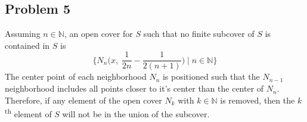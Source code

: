 \documentclass{article}
\begin{document}
\subsection*{Problem 5}
Assuming \(n\in\mathbb{N}\), an open cover for \(S\) such that no finite subcover of \(S\) is contained in \(S\) is
\begin{equation*}
	\bigg\{N_n\bigg(x,\;\frac{1}{2n}-\frac{1}{2(n+1)}\bigg)\;\bigg|\;n\in\mathbb{N}\bigg\}
\end{equation*}
The center point of each neighborhood \(N_n\) is positioned such that the \(N_{n-1}\) neighborhood includes all points closer to it's center than the center of \(N_n\). Therefore, if any element of the open cover \(N_k\) with \(k\in\mathbb{N}\) is removed, then the \(k\)\textsuperscript{th} element of \(S\) will not be in the union of the subcover.
\end{document}
